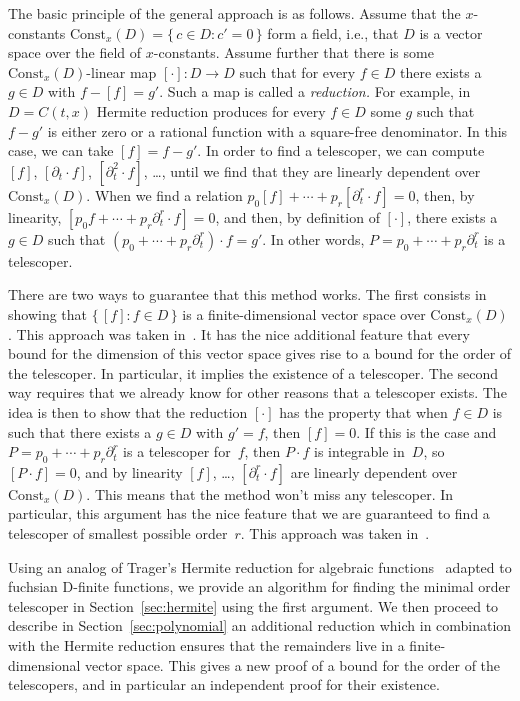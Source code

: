 \documentclass{sig-alternate}
\begin{document}
The basic principle of the general approach is as follows. Assume that the
$x$-constants $\mathrm{Const}_x(D)=\{\,c\in D:c'=0\,\}$ form a field, i.e., that $D$
is a vector space over the field of $x$-constants. Assume further that there is
some $\mathrm{Const}_x(D)$-linear map $[\cdot]\colon D\to D$ such that for every
$f\in D$ there exists a $g\in D$ with $f-[f]=g'$. Such a map is called a
\emph{reduction.} For example, in $D=C(t,x)$ Hermite reduction produces for
every $f\in D$ some $g$ such that $f-g'$ is either zero or a rational function
with a square-free denominator. In this case, we can take $[f]=f-g'$.
In order to find a telescoper, we can compute $[f]$, $[\partial_t\cdot f]$, $[\partial_t^2\cdot f]$, \dots,
until we find that they are linearly dependent over $\mathrm{Const}_x(D)$.
When we find a relation
$p_0[f] + \cdots + p_r[\partial_t^r\cdot f] = 0$,
then, by linearity,
$[p_0 f + \cdots + p_r \partial_t^r\cdot f] = 0$,
and then, by definition of $[\cdot]$, there exists a $g\in D$ such that $(p_0+\cdots + p_r\partial_t^r)\cdot f=g'$.
In other words, $P=p_0+\cdots + p_r\partial_t^r$ is a telescoper.

There are two ways to guarantee that this method works. The first consists in
showing that $\{\,[f]:f\in D\,\}$ is a finite-dimensional vector space over
$\mathrm{Const}_x(D)$. This approach was taken in~\cite{BCCL2010,bostan13a}. It has the
nice additional feature that every bound for the dimension of this vector space
gives rise to a bound for the order of the telescoper. In particular, it implies
the existence of a telescoper. The second way requires that we already know for
other reasons that a telescoper exists. The idea is then to show that the
reduction $[\cdot]$ has the property that when $f\in D$ is such that there
exists a $g\in D$ with $g'=f$, then $[f]=0$. If this is the case and
$P=p_0+\cdots+p_r\partial_t^r$ is a telescoper for~$f$, then $P\cdot f$ is integrable
in~$D$, so $[P\cdot f]=0$, and by linearity $[f]$, \dots, $[\partial_t^r\cdot f]$ are
linearly dependent over $\mathrm{Const}_x(D)$. This means that the method won't
miss any telescoper. In particular, this argument has the nice feature that we
are guaranteed to find a telescoper of smallest possible order~$r$. This
approach was taken in~\cite{chen15a}.

Using an analog of Trager's Hermite reduction for algebraic
functions~\cite{trager84,geddes92}  adapted to fuchsian D-finite functions, we provide an
algorithm for finding the minimal order telescoper in Section~\ref{sec:hermite} using the
first argument. We then proceed to describe in Section~\ref{sec:polynomial} an additional
reduction which in combination with the Hermite reduction ensures that the
remainders live in a finite-dimensional vector space.
This gives a new proof of a bound for the order of the telescopers,
and in particular an independent proof for their existence.
\end{document}
